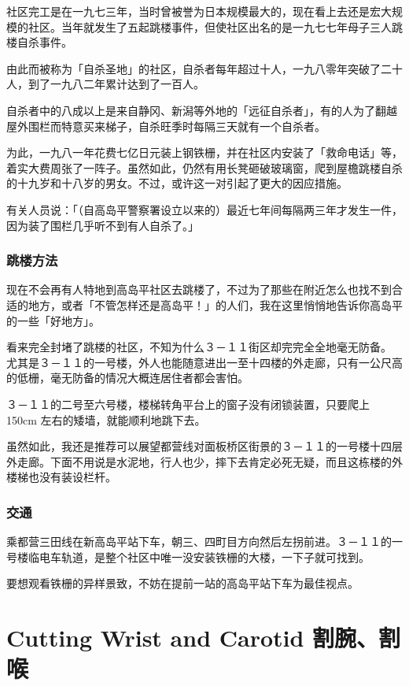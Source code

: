 \documentclass[UTF8]{ctexart}
\begin{document}
社区完工是在一九七三年，当时曾被誉为日本规模最大的，现在看上去还是宏大规模的社区。当年就发生了五起跳楼事件，但使社区出名的是一九七七年母子三人跳楼自杀事件。

由此而被称为「自杀圣地」的社区，自杀者每年超过十人，一九八零年突破了二十人，到了一九八二年累计达到了一百人。 

自杀者中的八成以上是来自静冈、新潟等外地的「远征自杀者」，有的人为了翻越屋外围栏而特意买来梯子，自杀旺季时每隔三天就有一个自杀者。

为此，一九八一年花费七亿日元装上钢铁栅，并在社区内安装了「救命电话」等，着实大费周张了一阵子。虽然如此，仍然有用长凳砸破玻璃窗，爬到屋檐跳楼自杀的十九岁和十八岁的男女。不过，或许这一对引起了更大的因应措施。

有关人员说：「（自高岛平警察署设立以来的）最近七年间每隔两三年才发生一件，因为装了围栏几乎听不到有人自杀了。」

\subsubsection*{跳楼方法}

现在不会再有人特地到高岛平社区去跳楼了，不过为了那些在附近怎么也找不到合适的地方，或者「不管怎样还是高岛平！」的人们，我在这里悄悄地告诉你高岛平的一些「好地方」。

看来完全封堵了跳楼的社区，不知为什么３－１１街区却完完全全地毫无防备。 
尤其是３－１１的一号楼，外人也能随意进出一至十四楼的外走廊，只有一公尺高的低栅，毫无防备的情况大概连居住者都会害怕。

３－１１的二号至六号楼，楼梯转角平台上的窗子没有闭锁装置，只要爬上 150cm 左右的矮墙，就能顺利地跳下去。

虽然如此，我还是推荐可以展望都营线对面板桥区街景的３－１１的一号楼十四层外走廊。下面不用说是水泥地，行人也少，摔下去肯定必死无疑，而且这栋楼的外楼梯也没有装设栏杆。

\subsubsection*{交通}

乘都营三田线在新高岛平站下车，朝三、四町目方向然后左拐前进。３－１１的一号楼临电车轨道，是整个社区中唯一没安装铁栅的大楼，一下子就可找到。

要想观看铁栅的异样景致，不妨在提前一站的高岛平站下车为最佳视点。

\newpage

\section{Cutting Wrist and Carotid 割腕、割喉}
\end{document}
